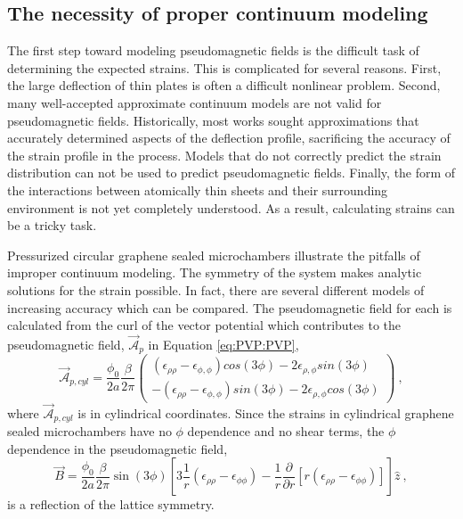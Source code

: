 \subsection{The necessity of proper continuum modeling\label{sec:PVP:GoodCont}}
The first step toward modeling pseudomagnetic fields is the difficult task of determining the expected strains.
This is complicated for several reasons.
First, the large deflection of thin plates is often a difficult nonlinear problem.
Second, many well-accepted approximate continuum models are not valid for pseudomagnetic fields.
Historically, most works sought approximations that accurately determined aspects of the deflection profile, sacrificing the accuracy of the strain profile in the process.
Models that do not correctly predict the strain distribution can not be used to predict pseudomagnetic fields.
Finally, the form of the interactions between atomically thin sheets and their surrounding environment is not yet completely understood.
As a result, calculating strains can be a tricky task.

Pressurized circular graphene sealed microchambers illustrate the pitfalls of improper continuum modeling.
The symmetry of the system makes analytic solutions for the strain possible.
In fact, there are several different models of increasing accuracy which can be compared.
The pseudomagnetic field for each is calculated from the curl of the vector potential which contributes to the pseudomagnetic field, $\vec{\mathcal{A}}_p$ in Equation \ref{eq:PVP:PVP}, 
\begin{equation*}
\vec{\mathcal{A}}_{p,cyl}=\frac{\phi_0}{2a} \frac{\beta}{2 \pi}
  \left( \begin{array}{c}
    (\epsilon_{\rho\rho}-\epsilon_{\phi,\phi}) cos(3\phi)-2 \epsilon_{\rho,\phi} sin (3 \phi) \\
    -(\epsilon_{\rho\rho}-\epsilon_{\phi,\phi}) sin(3\phi)-2 \epsilon_{\rho,\phi} cos (3 \phi)
  \end{array} \right) \ ,
\end{equation*}
where $\vec{\mathcal{A}}_{p,cyl}$ is in cylindrical coordinates.
Since the strains in cylindrical graphene sealed microchambers have no $\phi$ dependence and no shear terms, the $\phi$ dependence in the pseudomagnetic field,
\begin{equation*}
  \vec{B}=\frac{\phi_0}{2a}\frac{\beta}{2 \pi} \sin(3 \phi) \left[ 
  3 \frac{1}{r} (\epsilon_{\rho\rho}-\epsilon_{\phi \phi})-
  \frac{1}{r} \frac{\partial}{\partial r} \left[ r (\epsilon_{\rho\rho}-\epsilon_{\phi \phi}) \right]
  \right] \hat{z} \ ,
\end{equation*}
is a reflection of the lattice symmetry.

